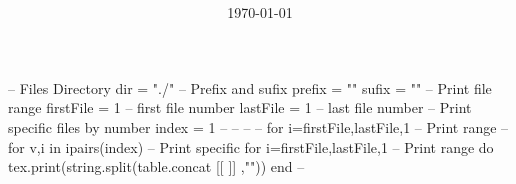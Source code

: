 \documentclass[
  class=article,
  multi={minipage},
  border={3mm},
]{standalone}
\title{\huge\bfseries\color{Emph}\mytitle}
\author{\Large\myauthor}
\date{\Large\today}
\begin{document}
\mymaketitle
\begin{luacode*}
  -- Files Directory
  dir = "./"
  -- Prefix and sufix
  prefix = ""
  sufix  = ""
  -- Print file range
  firstFile = 1 -- first file number
  lastFile  = 1 -- last  file number
  -- Print specific files by number
  index = {1}
  -- %
  -- %
  -- %
  -- for i=firstFile,lastFile,1 -- Print range
  -- for v,i in ipairs(index)   -- Print specific
  for i=firstFile,lastFile,1 -- Print range
  do
  tex.print(string.split(table.concat{
        [[
          \newpage
      ]]
},"\n"))
end
-- %
\end{luacode*}
\end{document}
